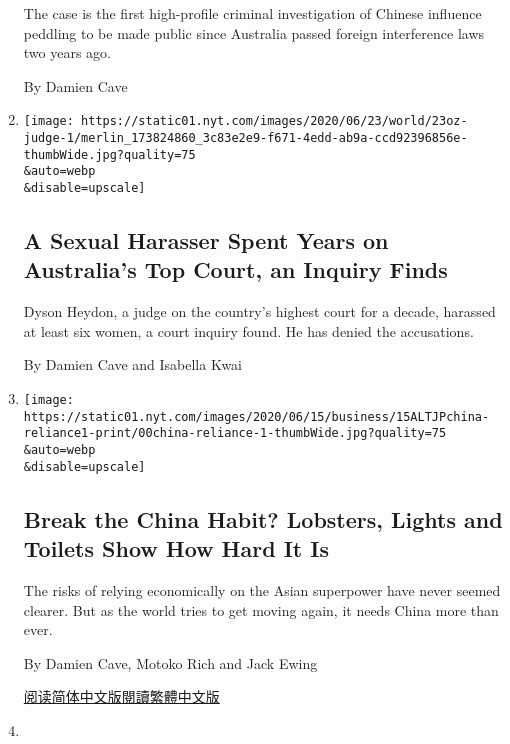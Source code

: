 \begin{enumerate}
  The case is the first high-profile criminal investigation of Chinese
  influence peddling to be made public since Australia passed foreign
  interference laws two years ago.

  By Damien Cave
\item
  \href{/2020/06/23/world/australia/dyson-heydon-high-court-metoo.html}{}

  \texttt{[image: https://static01.nyt.com/images/2020/06/23/world/23oz-judge-1/merlin\_173824860\_3c83e2e9-f671-4edd-ab9a-ccd92396856e-thumbWide.jpg?quality=75\\\&auto=webp\\\&disable=upscale]}

  \hypertarget{a-sexual-harasser-spent-years-on-australias-top-court-an-inquiry-finds}{%
  \subsection{A Sexual Harasser Spent Years on Australia's Top Court, an
  Inquiry
  Finds}\label{a-sexual-harasser-spent-years-on-australias-top-court-an-inquiry-finds}}

  Dyson Heydon, a judge on the country's highest court for a decade,
  harassed at least six women, a court inquiry found. He has denied the
  accusations.

  By Damien Cave and Isabella Kwai
\item
  \href{/2020/06/15/business/china-decoupling.html}{}

  \texttt{[image: https://static01.nyt.com/images/2020/06/15/business/15ALTJPchina-reliance1-print/00china-reliance-1-thumbWide.jpg?quality=75\\\&auto=webp\\\&disable=upscale]}

  \hypertarget{break-the-china-habit-lobsters-lights-and-toilets-show-how-hard-it-is}{%
  \subsection{Break the China Habit? Lobsters, Lights and Toilets Show
  How Hard It
  Is}\label{break-the-china-habit-lobsters-lights-and-toilets-show-how-hard-it-is}}

  The risks of relying economically on the Asian superpower have never
  seemed clearer. But as the world tries to get moving again, it needs
  China more than ever.

  By Damien Cave, Motoko Rich and Jack Ewing

  \href{https://cn.nytimes.com/business/20200615/china-decoupling/}{阅读简体中文版}\href{https://cn.nytimes.com/business/20200615/china-decoupling/zh-hant/}{閱讀繁體中文版}
\item
  \href{/2020/06/14/world/australia/coronavirus-stimulus-childcare-women.html}{}


\end{enumerate}
